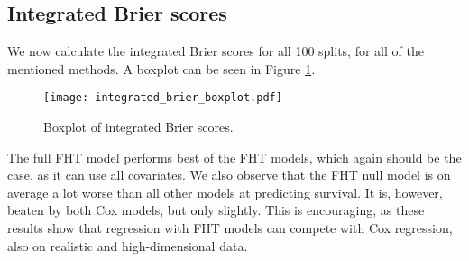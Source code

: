 


\subsection{Integrated Brier scores}
We now calculate the integrated Brier scores for all 100 splits, for all of the mentioned methods.
A boxplot can be seen in Figure \ref{fig:neuroblastoma-integrated-brier}.
\begin{figure}
\caption{Boxplot of integrated Brier scores.}
\label{fig:neuroblastoma-integrated-brier}
\centering
\texttt{[image: integrated\_brier\_boxplot.pdf]}
\end{figure}
The full FHT model performs best of the FHT models, which again should be the case, as it can use all covariates.
We also observe that the FHT null model is on average a lot worse than all other models at predicting survival.
It is, however, beaten by both Cox models, but only slightly.
This is encouraging, as these results show that regression with FHT models can compete with Cox regression, also on realistic and high-dimensional data.